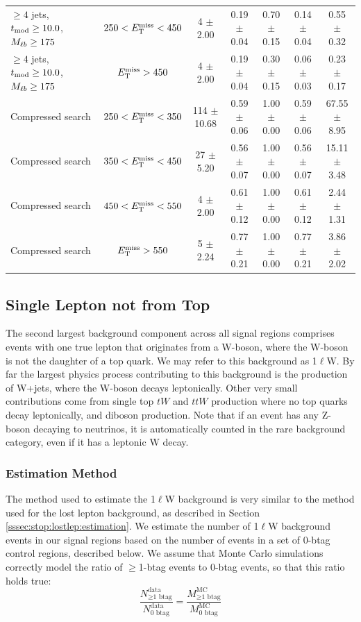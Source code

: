 \begin{table}
\begin{tabular}{|l|c|c|c|c|c|c|}
\hline
 $\ge4$ jets,~$t_\text{mod} \ge10.0$,~$M_{\ell b} \ge175$ & $250<E_\text{T}^\text{miss}<450$  & 4 $\pm$ 2.00  & 0.19 $\pm$ 0.04  & 0.70 $\pm$ 0.15 & 0.14 $\pm$ 0.04  & 0.55 $\pm$ 0.32  \\
 $\ge4$ jets,~$t_\text{mod} \ge10.0$,~$M_{\ell b} \ge175$ & $E_\text{T}^\text{miss}>450$  & 4 $\pm$ 2.00  & 0.19 $\pm$ 0.04  & 0.30 $\pm$ 0.15 & 0.06 $\pm$ 0.03  & 0.23 $\pm$ 0.17  \\
\hline
Compressed search & $250<E_\text{T}^\text{miss}<350$  & 114 $\pm$ 10.68  & 0.59 $\pm$ 0.06 & 1.00 $\pm$ 0.00 & 0.59 $\pm$ 0.06  & 67.55 $\pm$ 8.95  \\
Compressed search & $350<E_\text{T}^\text{miss}<450$  &  27 $\pm$ 5.20   & 0.56 $\pm$ 0.07 & 1.00 $\pm$ 0.00 & 0.56 $\pm$ 0.07  & 15.11 $\pm$ 3.48  \\
Compressed search & $450<E_\text{T}^\text{miss}<550$  &   4 $\pm$ 2.00   & 0.61 $\pm$ 0.12 & 1.00 $\pm$ 0.00 & 0.61 $\pm$ 0.12  &  2.44 $\pm$ 1.31  \\
Compressed search & $E_\text{T}^\text{miss}>550$      &   5 $\pm$ 2.24   & 0.77 $\pm$ 0.21 & 1.00 $\pm$ 0.00 & 0.77 $\pm$ 0.21  &  3.86 $\pm$ 2.02  \\
\hline
\end{tabular}
\end{table}

\subsection{Single Lepton not from Top}
\label{ssec:stop:1lw}

The second largest background component across all signal regions
comprises events with one true lepton that originates from a W-boson,
where the W-boson is not the daughter of a top quark. We may refer to
this background as 1$\ell$W. By far the
largest physics process contributing to this background is the
production of W+jets, where the W-boson decays leptonically. Other
very small contributions come from single top $tW$ and $ttW$
production where no top quarks decay leptonically, and diboson
production. Note that if an event has any Z-boson decaying to
neutrinos, it is automatically counted in the rare background
category, even if it has a leptonic W decay.

\subsubsection{Estimation Method}
\label{sssec:stop:1lw:estimation}

The method used to estimate the 1$\ell$W background is very similar to
the method used for the lost lepton background, as described in
Section \ref{sssec:stop:lostlep:estimation}. We estimate the number of
1$\ell$W background events in our signal regions based on the number of events in a
set of 0-btag control regions, described below. We assume that Monte
Carlo simulations correctly model the ratio of $\geq$1-btag events to
0-btag events, so that this ratio holds true:
\begin{equation}
\label{eq:stop:1lw:rationm}
\frac{N_{\geq\text{1 btag}}^\text{data}}{N_\text{0 btag}^\text{data}} = \frac{M_{\geq\text{1 btag}}^\text{MC}}{M_\text{0 btag}^\text{MC}}
\end{equation}

